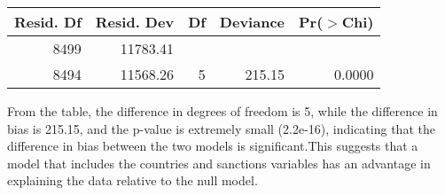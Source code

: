 \documentclass[12pt,letterpaper]{article}
\begin{document}
\begin{enumerate}
\begin{enumerate}
		
		\begin{table}[ht]\centering\begin{tabular}{rrrrr}  \hline Resid. Df & Resid. Dev & Df & Deviance & Pr($>$Chi) \\   \hline8499 & 11783.41 &  &  &  \\   8494 & 11568.26 & 5 & 215.15 & 0.0000 \\    \hline\end{tabular}\end{table}
		\noindent
		From the  table, the difference in degrees of freedom is 5, while the difference in bias is 215.15, and the p-value is extremely small (2.2e-16), indicating that the difference in bias between the two models is significant.This suggests that a model that includes the countries and sanctions variables has an advantage in explaining the data relative to the null model.
	\end{enumerate}
	

\end{enumerate}
\end{document}
